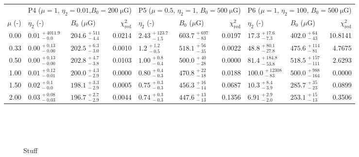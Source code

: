 \documentclass[manuscript]{aastex}  %
\newcommand*{\mt}{\mathrm}
\newcommand*{\unit}[1]{\;\mt{#1}}  %
\begin{document}
\begin{table*}[ht!]
\begin{tabular}{@{}rllrllrllr@{}}
    \midrule
    {} & \multicolumn{3}{c}{P4 ($\mu=1$,   $\eta_2=0.01$,$B_0=200 \unit{\mu G}$)}
       & \multicolumn{3}{c}{P5 ($\mu=0.5$, $\eta_2=1$,   $B_0=500 \unit{\mu G}$)}
       & \multicolumn{3}{c}{P6 ($\mu=1$,   $\eta_2=100$, $B_0=500 \unit{\mu G}$)} \\
    \cmidrule(lr){2-4} \cmidrule(lr){5-7} \cmidrule(l){8-10}
    $\mu$ (-) & $\eta_2$ (-) & $B_0$ ($\mu$G) & $\chi^2_{\mt{red}}$
              & $\eta_2$ (-) & $B_0$ ($\mu$G) & $\chi^2_{\mt{red}}$
              & $\eta_2$ (-) & $B_0$ ($\mu$G) & $\chi^2_{\mt{red}}$ \\
    \cmidrule{1-10}
    0.00 & ${0.01}^{\,+4011.9}_{\,-0.0}$ & ${204.6}^{\,+511}_{\,-4.4}$ & 0.0214
         & ${2.43}^{\,+123.7}_{\,-1.5}$ & ${603.7}^{\,+697}_{\,-83}$ & 0.0197
         & ${17.3}^{\,+17.6}_{\,-7.3}$ & ${402.0}^{\,+64}_{\,-43}$ & 10.8141 \\[0.5em]
    0.33 & ${0.00}^{\,+0.13}_{\,-0.00}$ & ${202.5}^{\,+6.3}_{\,-3.0}$ & 0.0010
         & ${1.2}^{\,+1.2}_{\,-0.5}$ & ${518.1}^{\,+56}_{\,-35}$ & 0.0022
         & ${48.8}^{\,+80.1}_{\,-27.8}$ & ${475.6}^{\,+114}_{\,-81}$ & 4.7675 \\[0.5em]
    0.50 & ${0.00}^{\,+0.13}_{\,-0.00}$ & ${202.8}^{\,+4.7}_{\,-3.8}$ & 0.0103
         & ${1.00}^{\,+0.8}_{\,-0.4}$ & ${500.0}^{\,+40}_{\,-28}$ & 0.0000
         & ${81.4}^{\,+184.8}_{\,-53.8}$ & ${518.5}^{\,+157}_{\,-111}$ & 2.6293 \\[0.5em]
    1.00 & ${0.01}^{\,+0.12}_{\,-0.01}$ & ${200.0}^{\,+4.3}_{\,-2.9}$ & 0.0000
         & ${0.80}^{\,+0.4}_{\,-0.3}$ & ${470.8}^{\,+22}_{\,-18}$ & 0.0188
         & ${100.0}^{\,+12308}_{\,-83}$ & ${500.0}^{\,+988}_{\,-164}$ & 0.0000 \\[0.5em]
    1.50 & ${0.02}^{\,+0.1}_{\,-0.0}$ & ${198.1}^{\,+3.3}_{\,-2.9}$ & 0.0005
         & ${0.75}^{\,+0.3}_{\,-0.3}$ & ${456.3}^{\,+16}_{\,-14}$ & 0.0687
         & ${10.3}^{\,+8.4}_{\,-3.9}$ & ${285.7}^{\,+35}_{\,-23}$ & 0.0899 \\[0.5em]
    2.00 & ${0.03}^{\,+0.08}_{\,-0.03}$ & ${196.7}^{\,+2.7}_{\,-2.9}$ & 0.0044
         & ${0.74}^{\,+0.3}_{\,-0.3}$ & ${447.6}^{\,+13}_{\,-13}$ & 0.1356
         & ${6.91}^{\,+2.9}_{\,-2.0}$ & ${253.1}^{\,+15}_{\,-13}$ & 0.3506 \\
    \bottomrule
    \end{tabular}

\end{table*}

\begin{figure*}[ht!]
    \centering
     \\
     \\
     \\
    \caption{Stuff}
\end{figure*}
\end{document}
